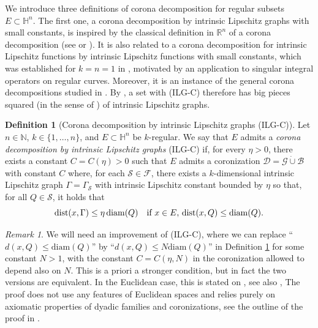 \documentclass[12pt]{amsart}
\newcommand{\R}{\mathbb R}
\renewcommand{\H}{\mathbb H}
\newcommand{\diam}{{\rm diam}}
\newcommand{\dist}{\mbox{dist}}
\numberwithin{equation}{section}
\theoremstyle{plain}
\theoremstyle{definition}
\newtheorem{definition}[theorem]{Definition}
\theoremstyle{remark}
\newtheorem{remark}[theorem]{Remark}
\begin{document}
We introduce three definitions of corona decomposition for regular subsets $E\subset \H^n$.
The first one, a corona decomposition by intrinsic Lipschitz graphs with small constants, 
is inspired by the classical definition in $\R^n$ of a corona decomposition 
(see  \cite[Definition 3.19]{David2} or \cite{David1}). It is also related to a corona decomposition for intrinsic Lipschitz functions by intrinsic Lipschitz functions with small constants, which was established for $k=n=1$ in \cite{MR4299821}, motivated by an application to singular integral operators on regular curves. Moreover, it is an instance of the general corona decompositions  studied in \cite{MR4485846}. By \cite[Theorem 1.1]{MR4485846}, a set with (ILG-C) therefore has big pieces squared (in the sense of \cite[Definition 2.11]{MR4485846}) of intrinsic Lipschitz graphs.
\begin{definition}[Corona decomposition by intrinsic Lipschitz graphs (ILG-C)]\label{d:ILG-C}
Let $n\in \mathbb{N}$, $k\in \{1,\ldots,n\}$, and $E\subset \mathbb{H}^n$ be $k$-regular.  We say that $E$ admits a \textit{corona decomposition by intrinsic Lipschitz graphs} (ILG-C) if, for every $\eta>0$, there exists a constant $C=C(\eta)>0$ such that $E$ admits a coronization $\mathcal{D}=\mathcal{G}\dot{\cup}\mathcal{B}$ with constant $C$  
where,  for each $\mathcal S\in\mathcal F$, there exists a $k$-dimensional intrinsic Lipschitz graph $\Gamma=\Gamma_\mathcal S$ with intrinsic Lipschitz constant bounded by $\eta$ so that, for all $Q\in\mathcal S$, it holds that
     \begin{equation}\label{eq:ILGcorona}
     \dist(x,\Gamma)\leq \eta\,\diam ( Q)\quad\text{if }x\in E, \,\dist(x,Q)\leq \diam(Q).
     \end{equation}
\end{definition}

\begin{remark}\label{r:ILG-Cmodif}
We will need an improvement of (ILG-C), where we can replace ``$d(x,Q)\leq \mathrm{diam}(Q)$'' by ``$d(x,Q)\leq N \mathrm{diam}(Q)$'' in Definition \ref{d:ILG-C} for some constant $N>1$, with the constant $C=C(\eta,N)$ in the coronization allowed to depend also on $N$. This is a priori a stronger condition, but in fact the two versions are equivalent. In the Euclidean case, this is stated on \cite[p.20]{David1}, see also
\cite[Lemma 3.31]{David2}, The proof does not use any features of Euclidean spaces and relies purely on axiomatic properties of dyadic families and coronizations, see the outline of the proof in \cite{David1,David2}.
\end{remark}
\end{document}
